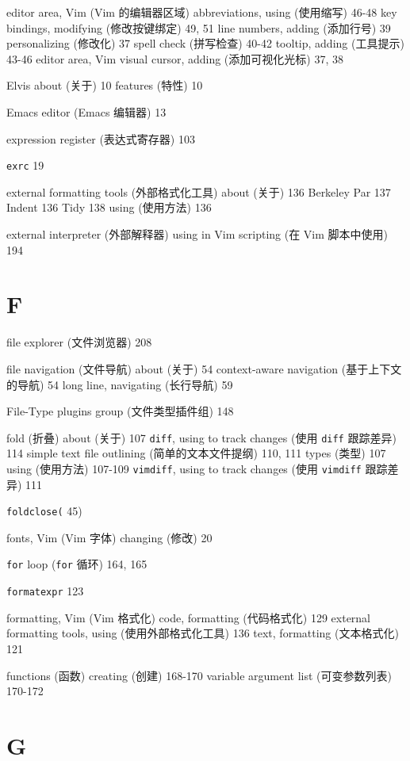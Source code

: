 editor area, Vim (Vim 的编辑器区域)
  abbreviations, using (使用缩写) 46-48
  key bindings, modifying (修改按键绑定) 49, 51
  line numbers, adding (添加行号) 39
  personalizing (修改化) 37
  spell check (拼写检查) 40-42
  tooltip, adding (工具提示) 43-46
  editor area, Vim visual cursor, adding (添加可视化光标) 37, 38

Elvis
  about (关于) 10
  features (特性) 10

Emacs editor (Emacs 编辑器) 13

expression register (表达式寄存器) 103

\texttt{exrc} 19

external formatting tools (外部格式化工具)
  about (关于) 136
  Berkeley Par 137
  Indent 136
  Tidy 138
  using (使用方法) 136

external interpreter (外部解释器)
  using in Vim scripting (在 Vim 脚本中使用) 194

\section{F}

file explorer (文件浏览器) 208

file navigation (文件导航)
  about (关于) 54
  context-aware navigation (基于上下文的导航) 54
  long line, navigating (长行导航) 59

File-Type plugins group (文件类型插件组) 148

fold (折叠)
  about (关于) 107
  \texttt{diff}, using to track changes (使用 \texttt{diff} 跟踪差异) 114
  simple text file outlining (简单的文本文件提纲) 110, 111
  types (类型) 107
  using (使用方法) 107-109
  \texttt{vimdiff}, using to track changes (使用 \texttt{vimdiff} 跟踪差异) 111

\texttt{foldclose(} 45)

fonts, Vim (Vim 字体)
  changing (修改) 20

\texttt{for} loop (\texttt{for} 循环) 164, 165

\texttt{formatexpr} 123

formatting, Vim (Vim 格式化)
  code, formatting (代码格式化) 129
  external formatting tools, using (使用外部格式化工具) 136
  text, formatting (文本格式化) 121

functions (函数)
  creating (创建) 168-170
  variable argument list (可变参数列表) 170-172

\section{G}

